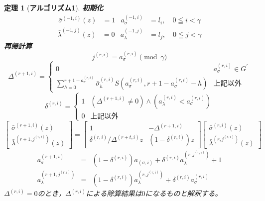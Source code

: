 \documentclass[12pt]{jarticle}
\theoremstyle{break}
\newtheorem{theorem}{定理}[section]
\def\itDelta{\mathit{\Delta}}
\begin{document}
\begin{framed}
\begin{theorem}[{\bf アルゴリズム1}]
{\bf 初期化}
\begin{align}
\bar{\sigma}^{(-1,i)}(z)&=1&a_{\sigma}^{(-1,i)}&=l_{i},\quad 0\leqq
i<\gamma\label{eq:9}
\end{align}
\begin{align}
\bar{\lambda}^{(-1,j)}(z)&=0&a_{\lambda}^{(-1,j)}&=l_{j},\quad 0\leqq j<\gamma
\label{eq:10}
\end{align}
{\bf 再帰計算}
\begin{equation}
j^{(r,i)}=a_{\sigma}^{(r,i)}\pmod{\gamma}\label{eq:11}
\end{equation}
\begin{equation}
\itDelta^{(r+1,i)}=
\begin{cases}
0&a_{\sigma}^{(r,i)}\in G^{\prime}\\
{\displaystyle\sum_{h=0}^{r+1-a_{\sigma}^{(r,i)}}\bar{\sigma}_{h}^{(r,i)}S(a_{\sigma}^{(r,i)},r+1-a_{\sigma}^{(r,i)}-h)}
&上記以外
\end{cases}
\label{eq:12}
\end{equation}
\begin{equation}
\delta^{(r,i)}=
\begin{cases}
1&(\itDelta^{(r+1,i)}\neq
0)\wedge(a_{\lambda}^{(r,i)}<a_{\sigma}^{(r,i)})\\
0&上記以外
\end{cases}
\label{eq:13}
\end{equation}
\begin{equation}
\left[
\begin{array}{c}
\bar{\sigma}^{(r+1,i)}(z)\\
\bar{\lambda}^{(r+1,j^{(r,i)})}(z)
\end{array}
\right]=\left[
\begin{array}{cc}
1&-\itDelta^{(r+1,i)}\\
\delta^{(r,i)}/\itDelta^{(r+t,i)}z&(1-\delta^{(r,i)})z
\end{array}
\right]\left[
\begin{array}{c}
\bar{\sigma}^{(r,i)}(z)\\
\bar{\lambda}^{(r,j^{(r,i)})}(z)
\end{array}
\right]\label{eq:14}
\end{equation}
\begin{eqnarray}
a_{\sigma}^{(r+1,i)}&=&(1-\delta^{(r,i)})a_{(\sigma,i)}+\delta^{(r,i)}a_{\lambda}^{(r,j^{(r,i)})}+1\label{eq:15}\\
a_{\lambda}^{(r+1,j^{(r,i)})}&=&(1-\delta^{(r,i)})a_{\lambda}^{(r,j^{(r,i)})}+\delta^{(r,i)}a_{\sigma}^{(r,i)}\label{eq:16}
\end{eqnarray}
$\itDelta^{(r,i)}=0$のとき，$\itDelta^{(r,i)}$による除算結果は$0$になるものと解釈する。
\end{theorem}
\end{framed}
\end{document}
